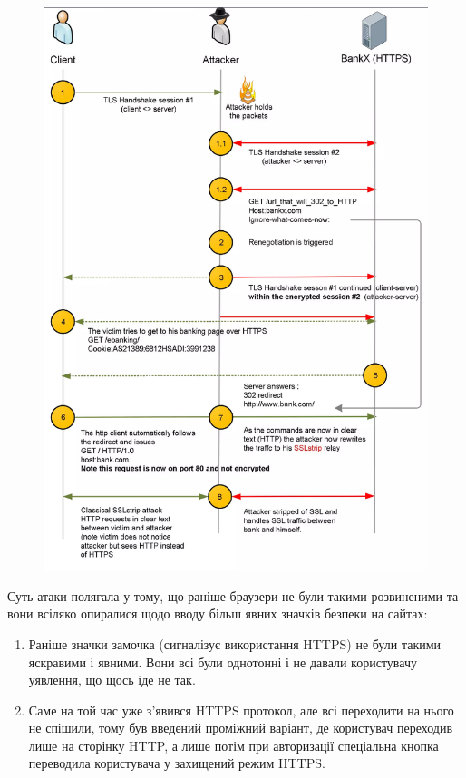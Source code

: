 \begin{itemize}
\begin{figure}[ht]
        \centering
        \includegraphics[scale=0.35]{../IMAGES/ssl_strip.png}
        \label{ssl_strip}
\end{figure}

    Суть атаки полягала у тому, що раніше браузери не були такими розвиненими та вони всіляко опиралися щодо вводу більш явних значків безпеки на сайтах:
\begin{enumerate}
    \item Раніше значки замочка (сигналізує використання HTTPS) не були такими яскравими і явними. Вони всі були однотонні і не давали користувачу уявлення, що щось іде не так.
    \item Саме на той час уже з'явився HTTPS протокол, але всі переходити на нього не спішили, тому був введений проміжний варіант, де користувач переходив лише на сторінку HTTP, а лише потім при авторизації спеціальна кнопка переводила користувача у захищений режим HTTPS. 
\end{enumerate}



\end{itemize}
